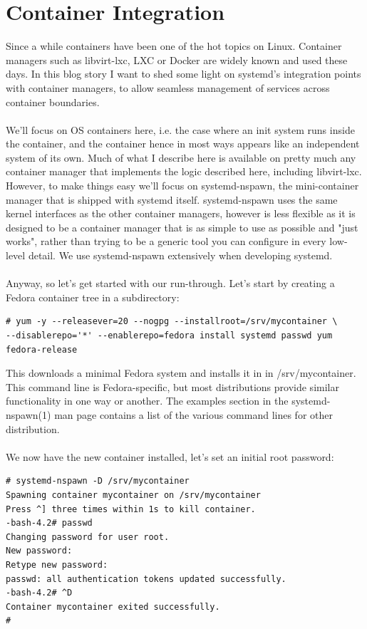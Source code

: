 \documentclass[titlepage]{article}
\begin{document}
\section{Container Integration}
Since a while containers have been one of the hot topics on Linux. Container
managers such as libvirt-lxc, LXC or Docker are widely known and used these
days. In this blog story I want to shed some light on systemd's integration
points with container managers, to allow seamless management of services
across container boundaries.
\\
\\
We'll focus on OS containers here, i.e. the case where an init system runs
inside the container, and the container hence in most ways appears like an
independent system of its own. Much of what I describe here is available on
pretty much any container manager that implements the logic described here,
including libvirt-lxc. However, to make things easy we'll focus on
systemd-nspawn, the mini-container manager that is shipped with systemd
itself. systemd-nspawn uses the same kernel interfaces as the other
container managers, however is less flexible as it is designed to be a
container manager that is as simple to use as possible and "just works",
rather than trying to be a generic tool you can configure in every low-level
detail. We use systemd-nspawn extensively when developing systemd.
\\
\\
Anyway, so let's get started with our run-through. Let's start by creating a
Fedora container tree in a subdirectory:
\begin{lstlisting}
# yum -y --releasever=20 --nogpg --installroot=/srv/mycontainer \ 
--disablerepo='*' --enablerepo=fedora install systemd passwd yum fedora-release
\end{lstlisting}
This downloads a minimal Fedora system and installs it in in /srv/mycontainer. This command line is Fedora-specific, but most distributions provide similar functionality in one way or another. The examples section in the systemd-nspawn(1) man page contains a list of the various command lines for other distribution.
\\
\\
We now have the new container installed, let's set an initial root password:
\begin{lstlisting}
# systemd-nspawn -D /srv/mycontainer
Spawning container mycontainer on /srv/mycontainer
Press ^] three times within 1s to kill container.
-bash-4.2# passwd
Changing password for user root.
New password:
Retype new password:
passwd: all authentication tokens updated successfully.
-bash-4.2# ^D
Container mycontainer exited successfully.
#
\end{lstlisting}
\end{document}
